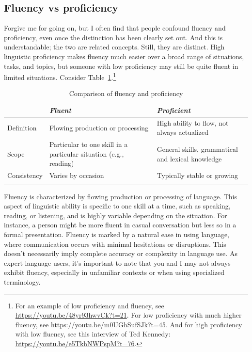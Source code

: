 \subsection{Fluency vs proficiency}

Forgive me for going on, but I often find that people confound fluency and proficiency, even once the distinction has been clearly set out. And this is understandable; the two are related concepts. Still, they are distinct. High linguistic proficiency makes fluency much easier over a broad range of situations, tasks, and topics, but someone with low proficiency may still be quite fluent in limited situations. Consider Table~\ref{tab:fluency_proficiency}.\footnote{For an example of low proficiency and fluency, see \url{https://youtu.be/48yr93hwvCk?t=21}. For low proficiency with much higher fluency, see \url{https://youtu.be/m0UGhSufSJk?t=45}. And for high proficiency with low fluency, see this interview of Ted Kennedy: \url{https://youtu.be/e5TkhNWPspM?t=76}.}

\setlength{\extrarowheight}{4pt} %
\begin{table}
\begin{tabular}{lp{}p{}}
\lsptoprule
 & \emph{Fluent} & \emph{Proficient} \\
\midrule
Definition & Flowing production or processing & High ability to flow, not always actualized \\
Scope & Particular to one skill in a particular situation (e.g., reading) & General skills, grammatical and lexical knowledge \\
Consistency & Varies by occasion & Typically stable or growing \\
\lspbottomrule
\end{tabular}
\caption{Comparison of fluency and proficiency}
\label{tab:fluency_proficiency}
\end{table}

Fluency is characterized by flowing production or processing of language. This aspect of linguistic ability is specific to one skill at a time, such as speaking, reading, or listening, and is highly variable depending on the situation. For instance, a person might be more fluent in casual conversation but less so in a formal presentation. Fluency is marked by a natural ease in using language, where communication occurs with minimal hesitations or disruptions. This doesn't necessarily imply complete accuracy or complexity in language use. As expert language users, it's important to note that you and I may not always exhibit fluency, especially in unfamiliar contexts or when using specialized terminology.

